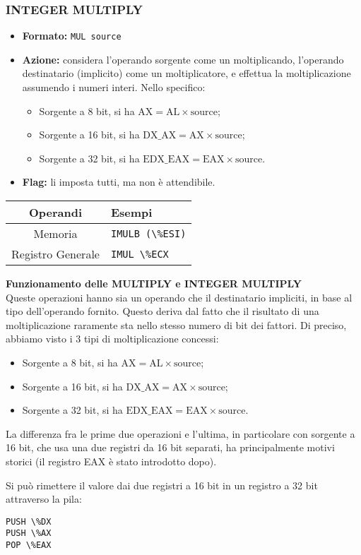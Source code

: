 \documentclass[a4paper,11pt]{article}
\begin{document}
\subsubsection{INTEGER MULTIPLY}
\begin{itemize}
	\item \textbf{Formato:} \lstinline|MUL source|
	\item \textbf{Azione:} considera l'operando sorgente come un moltiplicando, l'operando destinatario (implicito) come un moltiplicatore, e effettua la moltiplicazione assumendo i numeri interi. Nello specifico:
	\begin{itemize}
		\item Sorgente a 8 bit, si ha $\text{AX} = \text{AL} \times \text{source}$;
		\item Sorgente a 16 bit, si ha $\text{DX}\_\text{AX} = \text{AX} \times \text{source}$;
		\item Sorgente a 32 bit, si ha $\text{EDX}\_\text{EAX} = \text{EAX} \times \text{source}$.
	\end{itemize}
	\item \textbf{Flag:} li imposta tutti, ma non è attendibile.
\end{itemize}

		\begin{table}[H]
		\center {}
			\begin{tabular} { c | p{5cm} }
				\bfseries Operandi & \bfseries Esempi \\
				\hline
				Memoria & \lstinline|IMULB (\%ESI)| \\ 
				Registro Generale & \lstinline|IMUL \%ECX|
			\end{tabular}
		\end{table}

\par\medskip
\noindent
\textbf{\textsf{Funzionamento delle MULTIPLY e INTEGER MULTIPLY}} \\
Queste operazioni hanno sia un operando che il destinatario impliciti, in base al tipo dell'operando fornito.
Questo deriva dal fatto che il risultato di una moltiplicazione raramente sta nello stesso numero di bit dei fattori.
Di preciso, abbiamo visto i 3 tipi di moltiplicazione concessi:
\begin{itemize}
	\item Sorgente a 8 bit, si ha $\text{AX} = \text{AL} \times \text{source}$;
	\item Sorgente a 16 bit, si ha $\text{DX}\_\text{AX} = \text{AX} \times \text{source}$;
	\item Sorgente a 32 bit, si ha $\text{EDX}\_\text{EAX} = \text{EAX} \times \text{source}$.
\end{itemize}

La differenza fra le prime due operazioni e l'ultima, in particolare con sorgente a 16 bit, che usa una due registri da 16 bit separati, ha principalmente motivi storici (il registro EAX è stato introdotto dopo).

Si può rimettere il valore dai due registri a 16 bit in un registro a 32 bit attraverso la pila:
\begin{lstlisting}[language=assembler,style=codestyle]	
PUSH \%DX
PUSH \%AX
POP \%EAX
\end{lstlisting}
\end{document}
